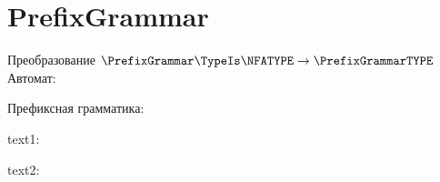 \section{PrefixGrammar}
\begin{frame}{Преобразование $\PrefixGrammar\TypeIs\NFATYPE\to\PrefixGrammarTYPE$}
	Автомат:


	Префиксная грамматика:


	text1:


	text2:


\end{frame}
